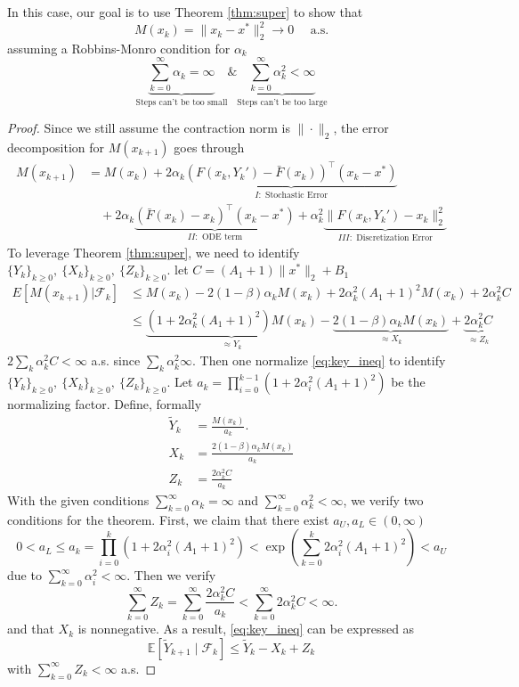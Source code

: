 \documentclass[11pt,twoside]{article}
\begin{document}
In this case, our goal is to use Theorem \ref{thm:super} to show that 
\[
M(x_k) = \|x_k -x^*\|_2^2 \to 0 \quad \text{ a.s.}
\]
assuming a Robbins-Monro condition for $\alpha_k$
\[
\underbrace{\sum_{k=0}^{\infty} \alpha_k = \infty}_{\text{Steps can't be too small}} \& \underbrace{\sum_{k=0}^{\infty} \alpha_k^2 < \infty}_{\text{Steps can't be too large}}
\]
\begin{proof}
    Since we still assume the contraction norm is $\|\cdot\|_2$, the error decomposition for $M(x_{k+1})$ goes through
     \begin{align*}
        M(x_{k+1}) 
        &= M(x_{k}) + 2 \alpha_k \underbrace{(F(x_k,Y_k') - \bar F(x_k))^\top(x_k - x^*)}_{I: \text{ Stochastic Error}} \\
        & \quad + 2 \alpha_k\underbrace{(\bar F(x_k)- x_k)^\top(x_k - x^*)}_{II: \text{ ODE term}} + \alpha_k^2 \underbrace{\| F(x_k,Y_k') - x_k\|_2^2}_{III: \text{ Discretization Error}} 
    \end{align*}
    To leverage Theorem \ref{thm:super}, we need to identify  $\{Y_k\}_{k\geq0},~\{X_k\}_{k\geq0},~\{Z_k\}_{k\geq0}$. let $C = (A_1+1)\|x^*\|_2+ B_1$
    \begin{align}
    \label{eq:key_ineq}
        E[M(x_{k+1})|\mathcal F_k] & \leq M(x_k) - 2(1-\beta)\alpha_k M(x_k) + 2\alpha_k^2(A_1+1)^2 M(x_k) + {2\alpha_k^2 C}\\        
        & \leq \underbrace{(1 + 2\alpha_k^2(A_1+1)^2) M(x_k)}_{\approx Y_k} - \underbrace{2{(1-\beta)\alpha_k M(x_k)}}_{\approx X_k} + \underbrace{2\alpha_k^2 C}_{\approx Z_k}
    \end{align}
    $2\sum_k\alpha_k^2 C < \infty$ a.s. since $\sum_k\alpha_k^2 \infty$. Then one normalize \eqref{eq:key_ineq} to identify $\{Y_k\}_{k\geq0},~\{X_k\}_{k\geq0},~\{Z_k\}_{k\geq0}$. Let $a_k = \prod_{i=0}^{k-1}(1 + 2\alpha_i^2(A_1+1)^2)$ be the normalizing factor. Define, formally
    \begin{align*}
        \tilde Y_{k} &= \frac{M(x_k)}{a_k}. \\
        X_k &= \frac{2(1-\beta)\alpha_k M(x_k)}{a_k} \\
        Z_k &= \frac{2\alpha_k^2 C}{a_k}
    \end{align*}
    With the given conditions $\sum_{k=0}^\infty \alpha_k = \infty$ and $\sum_{k=0}^\infty \alpha_k^2 < \infty$, we verify two conditions for the theorem. First, we claim that there exist $a_U,a_L \in (0, \infty)$ 
    \[
    0< a_L \leq a_k = \prod_{i=0}^{k}(1 + 2\alpha_i^2(A_1+1)^2) < \exp\left(\sum_{k=0}^k2\alpha_i^2(A_1+1)^2\right) < a_U
    \] 
    due to $\sum_{k=0}^\infty \alpha_i^2 < \infty$. Then we verify
    \[
    \sum_{k=0}^{\infty}Z_k = \sum_{k=0}^{\infty}\frac{2\alpha_k^2 C}{a_k} < \sum_{k=0}^{\infty}2\alpha_k^2 C < \infty.
    \]
    and that $X_k$ is nonnegative. As a result, \eqref{eq:key_ineq} can be expressed as 
    $$
    \mathbb{E}\left[\tilde Y_{k+1} \mid \mathcal{F}_k\right] \leq \tilde Y_k-X_k+Z_k
    $$
    with $\sum_{k=0}^{\infty}Z_k < \infty$ a.s. 


\end{proof}
\end{document}
